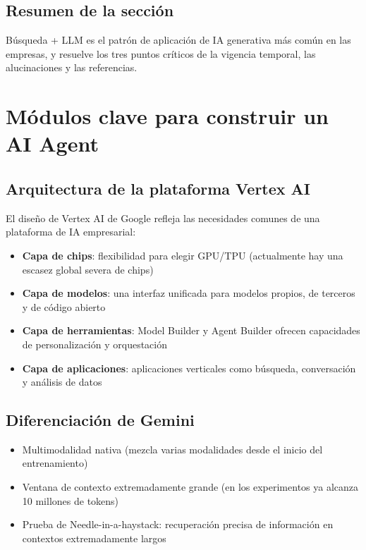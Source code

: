 \documentclass[a4paper]{article}
\begin{document}
\subsection{Resumen de la sección}

Búsqueda + LLM es el patrón de aplicación de IA generativa más común en las empresas, y resuelve los tres puntos críticos de la vigencia temporal, las alucinaciones y las referencias.

\section{Módulos clave para construir un AI Agent}

\subsection{Arquitectura de la plataforma Vertex AI}

El diseño de Vertex AI de Google refleja las necesidades comunes de una plataforma de IA empresarial:

\begin{itemize}
    \item \textbf{Capa de chips}: flexibilidad para elegir GPU/TPU (actualmente hay una escasez global severa de chips)
    \item \textbf{Capa de modelos}: una interfaz unificada para modelos propios, de terceros y de código abierto
    \item \textbf{Capa de herramientas}: Model Builder y Agent Builder ofrecen capacidades de personalización y orquestación
    \item \textbf{Capa de aplicaciones}: aplicaciones verticales como búsqueda, conversación y análisis de datos
\end{itemize}

\subsection{Diferenciación de Gemini}

\begin{itemize}
    \item Multimodalidad nativa (mezcla varias modalidades desde el inicio del entrenamiento)
    \item Ventana de contexto extremadamente grande (en los experimentos ya alcanza 10 millones de tokens)
    \item Prueba de Needle-in-a-haystack: recuperación precisa de información en contextos extremadamente largos
\end{itemize}
\end{document}
